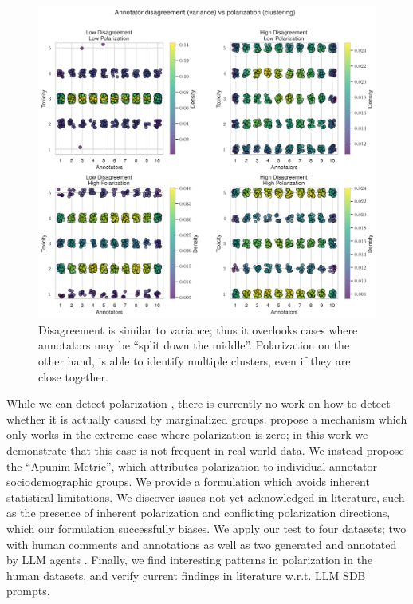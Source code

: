 \documentclass[twocolumn, 8pt]{article}
\begin{document}
\begin{figure}
	\centering
	\includegraphics[width=0.8\linewidth]{disagreement_vs_polarization.png}
	\caption{Disagreement is similar to variance; thus it overlooks cases where annotators may be ``split down the middle''. Polarization on the other hand, is able to identify multiple clusters, even if they are close together.}
	\label{fig:disagreement_vs_polarization}
\end{figure}

While we can detect polarization \parencite{pavlopoulos-likas-2024}, there is currently no work on how to detect whether it is actually caused by marginalized groups.  \textcite{pavlopoulos-likas-2024} propose a mechanism which only works in the extreme case where polarization is zero; in this work we demonstrate that this case is not frequent in real-world data. %
We instead propose the ``Apunim Metric'', which attributes polarization to individual annotator sociodemographic groups. We provide a formulation which avoids inherent statistical limitations. We discover issues not yet acknowledged in literature, such as the presence of inherent polarization and conflicting polarization directions, which our formulation successfully biases. We apply our test to four datasets; two with human comments and annotations \parencite{sap-etal-2022-annotators, kumar-et-al-2021} as well as two generated and annotated by \ac{LLM} agents \cite{tsirmpas2025scalableevaluationonlinefacilitation}. Finally, we find interesting patterns in polarization in the human datasets, and verify current findings in literature w.r.t. \ac{LLM} \ac{SDB} prompts.
\end{document}
